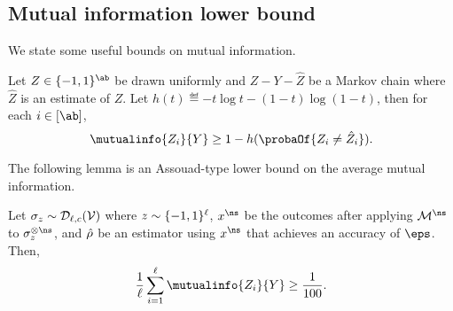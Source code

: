 \subsection{Mutual information lower bound}
We state some useful bounds on mutual information.
\begin{lemma}
\label{lem:MI-lower}
    Let $Z\in\{-1, 1\}^\ab$ be drawn uniformly and $Z-Y-\hat{Z}$ be a Markov chain where $\hat{Z}$ is an estimate of $Z$. Let $h(t)\eqdef -t\log t-(1-t)\log(1-t)$, then for each $i\in[\ab]$,
    \[
    \mutualinfo{Z_i}{Y}\ge 1-h(\probaOf{Z_i\ne \hat{Z}_i}).
    \]
\end{lemma}

The following lemma is an Assouad-type lower bound on the average mutual information. 
\begin{lemma}
\label{lem:avg-MI-lower}
    Let $\sigma_{z}\sim{\mathcal{D}_{\ell,{c}}}({\mathcal{V}})$ where ${z}\sim\{-1,1\}^{\ell}$, $\out^\ns$ be the outcomes after applying $\POVM^\ns$ to $\sigma_\ptb^{\otimes\ns}$, and ${\hat{\rho}}$ be an estimator using $\out^\ns$ that achieves an accuracy of $\eps$. Then,
    \begin{equation}
        \frac{1}{\ell}\sum_{i=1}^{\ell}\mutualinfo{Z_i}{Y}\ge\frac{1}{100}.
    \end{equation}
\end{lemma}


